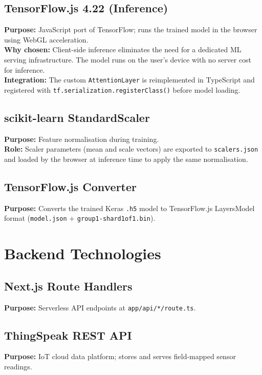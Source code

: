 \subsection{TensorFlow.js 4.22 (Inference)}
\textbf{Purpose:} JavaScript port of TensorFlow; runs the trained model in the browser using WebGL acceleration.\\
\textbf{Why chosen:} Client-side inference eliminates the need for a dedicated ML serving infrastructure. The model runs on the user's device with no server cost for inference.\\
\textbf{Integration:} The custom \texttt{AttentionLayer} is reimplemented in TypeScript and registered with \texttt{tf.\allowbreak{}serialization.\allowbreak{}registerClass()} before model loading.

\subsection{scikit-learn StandardScaler}
\textbf{Purpose:} Feature normalisation during training.\\
\textbf{Role:} Scaler parameters (mean and scale vectors) are exported to \texttt{scalers.\allowbreak{}json} and loaded by the browser at inference time to apply the same normalisation.

\subsection{TensorFlow.js Converter}
\textbf{Purpose:} Converts the trained Keras \texttt{.\allowbreak{}h5} model to TensorFlow.js LayersModel format (\texttt{model.\allowbreak{}json} + \texttt{group1-shard1of1.\allowbreak{}bin}).

\section{Backend Technologies}

\subsection{Next.js Route Handlers}
\textbf{Purpose:} Serverless API endpoints at \texttt{app/\allowbreak{}api/\allowbreak{}*/\allowbreak{}route.\allowbreak{}ts}.

\subsection{ThingSpeak REST API}
\textbf{Purpose:} IoT cloud data platform; stores and serves field-mapped sensor readings.

